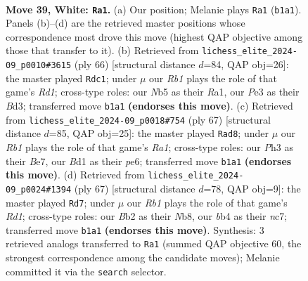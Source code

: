 \documentclass[11pt]{article}
\begin{document}
\clearpage

\begin{figure}[p]\centering
\begin{subfigure}{0.46\textwidth}\centering
\resizebox{\linewidth}{!}{%
\newchessgame
\chessboard[
  setfen={1nb5/1p3k2/1nr2p2/pN1p2p1/1b4Pp/1P2P2P/PB2PK2/1R1B4 w - - 12 39},
  showmover=false,
  pgfstyle=straightmove, color=movearrow, markmove={b1-a1}
]}
\caption{}
\end{subfigure}\hfill
\begin{subfigure}{0.46\textwidth}\centering
\resizebox{\linewidth}{!}{%
\newchessgame
\chessboard[
  setfen={2r3k1/4rpp1/3p2n1/p1bP4/Pp2PP2/3B2P1/3B2K1/R2R4 w - - 0 34},
  showmover=false,
  pgfstyle=straightmove, color=movearrow, markmove={d1-c1}
]}
\caption{}
\end{subfigure}
\\[4pt]
\begin{subfigure}{0.46\textwidth}\centering
\resizebox{\linewidth}{!}{%
\newchessgame
\chessboard[
  setfen={r7/p3b1k1/2p1Pp2/2pr1Ppp/2Np4/P5PP/1P1BK3/5R2 b - - 4 34},
  showmover=false,
  pgfstyle=straightmove, color=movearrow, markmove={a8-d8}
]}
\caption{}
\end{subfigure}\hfill
\begin{subfigure}{0.46\textwidth}\centering
\resizebox{\linewidth}{!}{%
\newchessgame
\chessboard[
  setfen={1n1rbk2/p1N2p2/Pp6/4p1p1/1P1pP1Pp/3P3P/3R1P2/3B2K1 b - - 0 34},
  showmover=false,
  pgfstyle=straightmove, color=movearrow, markmove={d8-d7}
]}
\caption{}
\end{subfigure}
\caption{\textbf{Move 39, White: \texttt{Ra1}.} (a) Our position; Melanie plays \texttt{Ra1} (\texttt{b1a1}). Panels (b)--(d) are the retrieved master positions whose correspondence most drove this move (highest QAP objective among those that transfer to it). (b) Retrieved from \texttt{lichess\_elite\_2024-09\_p0010\#3615} (ply 66) [structural distance $d$=84, QAP obj=26]: the master played \texttt{Rdc1}; under $\mu$ our \emph{Rb1} plays the role of that game's \emph{Rd1}; cross-type roles: our \emph{N}b5 as their \emph{R}a1, our \emph{P}e3 as their \emph{B}d3; transferred move \texttt{b1a1} \textbf{(endorses this move)}. (c) Retrieved from \texttt{lichess\_elite\_2024-09\_p0018\#754} (ply 67) [structural distance $d$=85, QAP obj=25]: the master played \texttt{Rad8}; under $\mu$ our \emph{Rb1} plays the role of that game's \emph{Ra1}; cross-type roles: our \emph{P}h3 as their \emph{B}e7, our \emph{B}d1 as their \emph{p}e6; transferred move \texttt{b1a1} \textbf{(endorses this move)}. (d) Retrieved from \texttt{lichess\_elite\_2024-09\_p0024\#1394} (ply 67) [structural distance $d$=78, QAP obj=9]: the master played \texttt{Rd7}; under $\mu$ our \emph{Rb1} plays the role of that game's \emph{Rd1}; cross-type roles: our \emph{B}b2 as their \emph{N}b8, our \emph{b}b4 as their \emph{n}c7; transferred move \texttt{b1a1} \textbf{(endorses this move)}. Synthesis: 3 retrieved analogs transferred to \texttt{Ra1} (summed QAP objective 60, the strongest correspondence among the candidate moves); Melanie committed it via the \texttt{search} selector.}
\label{fig:thought-m76}
\end{figure}
\end{document}
